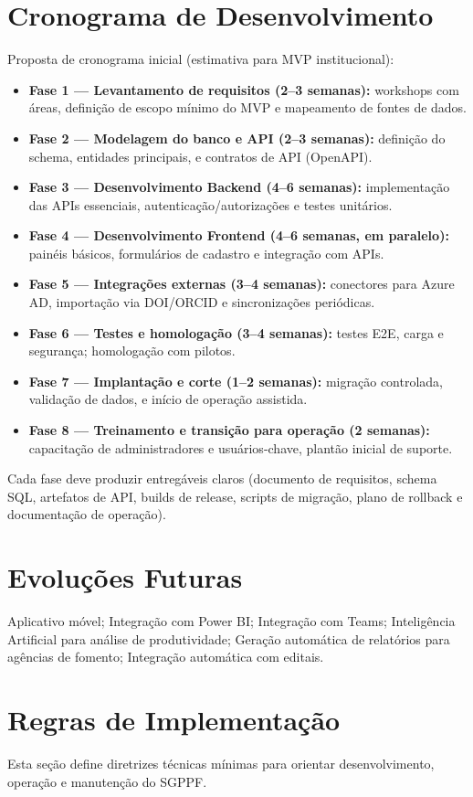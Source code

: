 \documentclass[12pt,a4paper]{article}
\begin{document}
\section{Cronograma de Desenvolvimento}
Proposta de cronograma inicial (estimativa para MVP institucional):
\begin{itemize}[leftmargin=*]
  \item \textbf{Fase 1 — Levantamento de requisitos (2–3 semanas):} workshops com áreas, definição de escopo mínimo do MVP e mapeamento de fontes de dados.
  \item \textbf{Fase 2 — Modelagem do banco e API (2–3 semanas):} definição do schema, entidades principais, e contratos de API (OpenAPI).
  \item \textbf{Fase 3 — Desenvolvimento Backend (4–6 semanas):} implementação das APIs essenciais, autenticação/autorizações e testes unitários.
  \item \textbf{Fase 4 — Desenvolvimento Frontend (4–6 semanas, em paralelo):} painéis básicos, formulários de cadastro e integração com APIs.
  \item \textbf{Fase 5 — Integrações externas (3–4 semanas):} conectores para Azure AD, importação via DOI/ORCID e sincronizações periódicas.
  \item \textbf{Fase 6 — Testes e homologação (3–4 semanas):} testes E2E, carga e segurança; homologação com pilotos.
  \item \textbf{Fase 7 — Implantação e corte (1–2 semanas):} migração controlada, validação de dados, e início de operação assistida.
  \item \textbf{Fase 8 — Treinamento e transição para operação (2 semanas):} capacitação de administradores e usuários-chave, plantão inicial de suporte.
\end{itemize}

Cada fase deve produzir entregáveis claros (documento de requisitos, schema SQL, artefatos de API, builds de release, scripts de migração, plano de rollback e documentação de operação).

\section{Evoluções Futuras}
Aplicativo móvel; Integração com Power BI; Integração com Teams; Inteligência Artificial para análise de produtividade; Geração automática de relatórios para agências de fomento; Integração automática com editais.

\section{Regras de Implementação}
Esta seção define diretrizes técnicas mínimas para orientar desenvolvimento, operação e manutenção do SGPPF.
\end{document}
